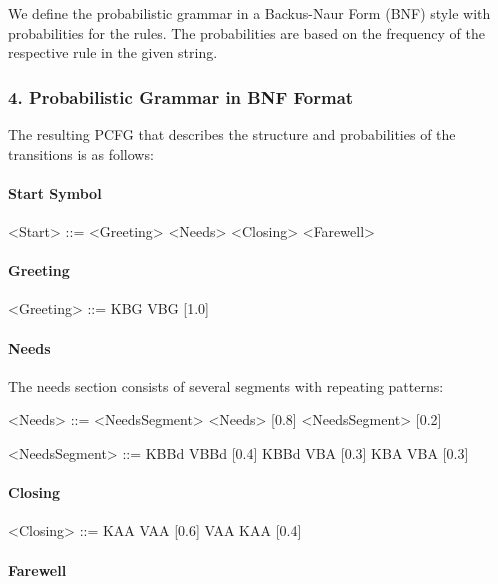 \documentclass[
]{article}
\begin{document}
We define the probabilistic grammar in a Backus-Naur Form (BNF) style with probabilities for the rules. The probabilities are based on the frequency of the respective rule in the given string.

\subsubsection{4. Probabilistic Grammar in BNF Format}\label{probabilistic-grammar-in-bnf-format}

The resulting PCFG that describes the structure and probabilities of the transitions is as follows:

\paragraph{Start Symbol}

\textless Start\textgreater{} ::= \textless Greeting\textgreater{} \textless Needs\textgreater{} \textless Closing\textgreater{} \textless Farewell\textgreater{}

\paragraph{Greeting}

\textless Greeting\textgreater{} ::= KBG VBG [1.0]

\paragraph{Needs}

The needs section consists of several segments with repeating patterns:

\textless Needs\textgreater{} ::= \textless NeedsSegment\textgreater{} \textless Needs\textgreater{} [0.8] \textbar{} \textless NeedsSegment\textgreater{} [0.2]

\textless NeedsSegment\textgreater{} ::= KBBd VBBd [0.4] \textbar{} KBBd VBA [0.3] \textbar{} KBA VBA [0.3]

\paragraph{Closing}

\textless Closing\textgreater{} ::= KAA VAA [0.6] \textbar{} VAA KAA [0.4]

\paragraph{Farewell}
\end{document}
